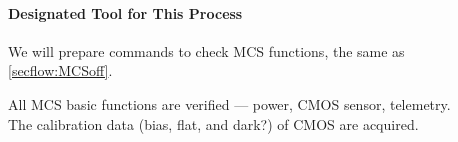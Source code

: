 \paragraph{Designated Tool for This Process}
We will prepare commands to check MCS functions, the same as \ref{secflow:MCSoff}.



\begin{itembox}[l]{}
All MCS basic functions are verified --- power, CMOS sensor, telemetry.  \\
The calibration data (bias, flat, and dark?) of CMOS are acquired.

\end{itembox}

